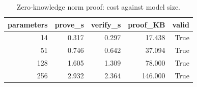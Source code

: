\begin{table}
\caption{Zero-knowledge norm proof: cost against model size.}
\label{tab:T08_zk_cost}
\begin{tabular}{rrrrr}
\toprule
parameters & prove\_s & verify\_s & proof\_KB & valid \\
\midrule
14 & 0.317 & 0.297 & 17.438 & True \\
51 & 0.746 & 0.642 & 37.094 & True \\
128 & 1.605 & 1.309 & 78.000 & True \\
256 & 2.932 & 2.364 & 146.000 & True \\
\bottomrule
\end{tabular}
\end{table}
